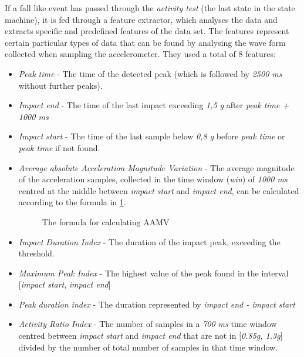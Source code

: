 \documentclass[12pt, a4paper, onecolumn]{article}
\begin{document}
	
	
	If a fall like event has passed through the  \textit{activity test} (the last state in the state machine), it is fed through a feature extractor, which analyses the data and extracts specific and predefined features of the data set. The features represent certain particular types of data that can be found by analysing the wave form collected when sampling the accelerometer. They used a total of 8 features:
	
	\begin{itemize}
		\item \textit{Peak time} - The time of the detected peak (which is followed by \textit{2500 ms} without further peaks).
		\item \textit{Impact end} - The time of the last impact exceeding \textit{1,5 g} after \textit{peak time + 1000 ms}
		\item  \textit{Impact start} - The time of the last sample below \textit{0,8 g} before \textit{peak time} or \textit{peak time} if not found.
		
		\item \textit{Average absolute Acceleration Magnitude Variation} - The average magnitude of the acceleration samples, collected in the time window (\textit{win}) of \textit{1000 ms} centred at the middle between \textit{impact start} and \textit{impact end}, can be calculated according to the formula in \ref{fig:aamv-formula}. 
		
		
		\begin{figure}[H]
			\centering
			\caption{The formula for calculating AAMV \cite{piza_uni}}%
			\label{fig:aamv-formula}%
		\end{figure}
		
		\item \textit{Impact Duration Index} - The duration of the impact peak, exceeding the threshold.
		\item \textit{Maximum Peak Index} - The highest value of the peak found in the interval [\textit{impact start}, \textit{impact end}]
		
		\item \textit{Peak duration index} - The duration represented by \textit{impact end - impact start}
		\item \textit{Activity Ratio Index} - The number of samples in a \textit{700 ms} time window centred between \textit{impact start} and \textit{impact end} that are not in [\textit{0.85g, 1.3g}] divided by the number of total number of samples in that time window.
		

\end{itemize}
\end{document}
